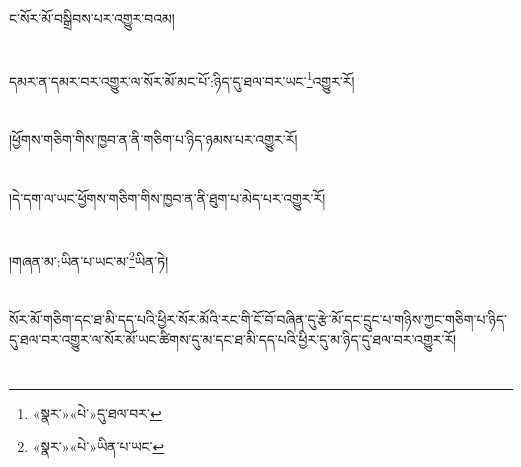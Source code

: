 ང་སོར་མོ་བསྒྲིབས་པར་འགྱུར་བའམ།\chapter{ }དམར་ན་དམར་བར་འགྱུར་ལ་སོར་མོ་མང་པོ་:ཉིད་དུ་ཐལ་བར་ཡང་\footnote{«སྣར་»«པེ་»དུ་ཐལ་བར་}འགྱུར་རོ།\chapter{ }།ཕྱོགས་གཅིག་གིས་ཁྱབ་ན་ནི་གཅིག་པ་ཉིད་ཉམས་པར་འགྱུར་རོ།\chapter{ }།དེ་དག་ལ་ཡང་ཕྱོགས་གཅིག་གིས་ཁྱབ་ན་ནི་ཐུག་པ་མེད་པར་འགྱུར་རོ།\chapter{ }།གཞན་མ་:ཡིན་པ་ཡང་མ་\footnote{«སྣར་»«པེ་»ཡིན་པ་ཡང་}ཡིན་ཏེ།\chapter{ }སོར་མོ་གཅིག་དང་ཐ་མི་དད་པའི་ཕྱིར་སོར་མོའི་རང་གི་ངོ་བོ་བཞིན་དུ་རྩེ་མོ་དང་དྲུང་པ་གཉིས་ཀྱང་གཅིག་པ་ཉིད་དུ་ཐལ་བར་འགྱུར་ལ་སོར་མོ་ཡང་ཚིགས་དུ་མ་དང་ཐ་མི་དད་པའི་ཕྱིར་དུ་མ་ཉིད་དུ་ཐལ་བར་འགྱུར་རོ།\chapter{ }